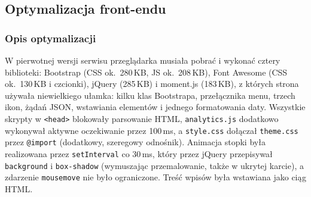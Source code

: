 \makeatletter
{}
\makeatother


\subsection{Optymalizacja front-endu}
\subsubsection{Opis optymalizacji}

W pierwotnej wersji serwisu przeglądarka musiała pobrać i wykonać cztery biblioteki:
Bootstrap (CSS ok.\ 280\,KB, JS ok.\ 208\,KB), Font Awesome (CSS ok.\ 130\,KB
i czcionki), jQuery (285\,KB) i moment.js (183\,KB), z których strona używała
niewielkiego ułamka: kilku klas Bootstrapa, przełącznika menu, trzech ikon,
żądań JSON, wstawiania elementów i jednego formatowania daty. Wszystkie skrypty
w \texttt{<head>} blokowały parsowanie HTML, \texttt{analytics.js} dodatkowo
wykonywał aktywne oczekiwanie przez 100\,ms, a \texttt{style.css} dołączał
\texttt{theme.css} przez \texttt{@import} (dodatkowy, szeregowy odnośnik).
Animacja stopki była realizowana przez \texttt{setInterval} co 30\,ms,
który przez jQuery przepisywał \texttt{background} i \texttt{box-shadow}
(wymuszając przemalowanie, także w ukrytej karcie), a zdarzenie \texttt{mousemove}
nie było ograniczone. Treść wpisów była wstawiana jako ciąg HTML.

